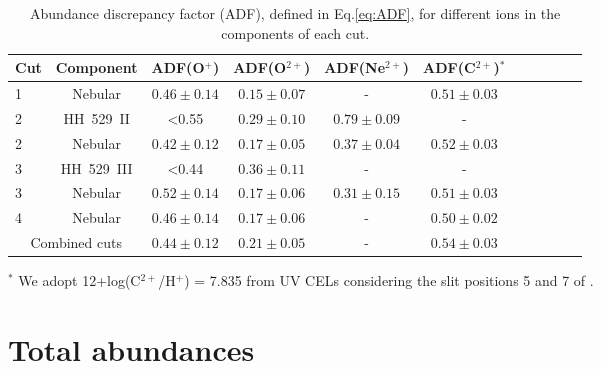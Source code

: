 \documentclass[fleqn,usenatbib]{mnras}
\begin{document}
\begin{table*}
\centering\caption{Abundance discrepancy factor (ADF), defined in Eq.\ref{eq:ADF}, for different ions in the components of each cut.}
\label{tab:adf}
\begin{tabular}{lcccccccccc}
\hline
Cut & Component &\multicolumn{1}{c}{ADF(O$^{+}$)}&\multicolumn{1}{c}{ADF(O$^{2+}$)} & \multicolumn{1}{c}{ADF(Ne$^{2+}$)} & \multicolumn{1}{c}{ADF(C$^{2+}$)$^*$} \\


\hline
1& Nebular&$0.46 \pm 0.14$ &$0.15 \pm 0.07$&-&$0.51\pm 0.03$\\

2& HH~529~II&<0.55 &$0.29\pm 0.10 $&$0.79\pm 0.09$&-&\\

2& Nebular&$0.42\pm 0.12$&$0.17\pm0.05$&$0.37\pm0.04$&$0.52\pm 0.03$\\

3& HH~529~III&<0.44 & $ 0.36 \pm 0.11$&-&-\\

3& Nebular &$0.52\pm0.14$&$0.17\pm0.06$&$0.31\pm0.15$&$0.51\pm 0.03$\\

4& Nebular&$0.46 \pm 0.14$&$0.17\pm0.06$&-&$0.50\pm 0.02$\\

\multicolumn{2}{c}{Combined cuts}&$0.44\pm 0.12$&$0.21\pm0.05$&-&$0.54\pm 0.03$\\
\hline
\end{tabular}
\begin{description}
\item $^*$ We adopt 12+log(C$^{2+}$/H$^+$) = 7.835 from UV CELs considering the slit positions 5 and 7 of \citet{walter92}.\\
\end{description}
\end{table*}


\section{Total abundances}
\label{sec:total_abun}
\end{document}
